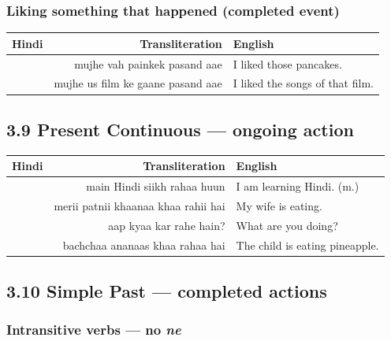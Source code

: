 \subsubsection*{Liking something that happened (completed event)}


\begin{tabular}{@{}HRG@{}}
  \toprule
  Hindi & Transliteration & English \\
  \midrule
            & mujhe vah painkek pasand aae        & I liked those pancakes. \\
     & mujhe us film ke gaane pasand aae   & I liked the songs of that film. \\
  \bottomrule
\end{tabular}

\subsection{3.9 Present Continuous — ongoing action}


\begin{tabular}{@{}HRG@{}}
  \toprule
  Hindi & Transliteration & English \\
  \midrule
             & main Hindi siikh rahaa huun          & I am learning Hindi. (m.) \\
         & merii patnii khaanaa khaa rahii hai & My wife is eating. \\
                 & aap kyaa kar rahe hain?               & What are you doing? \\
            & bachchaa ananaas khaa rahaa hai      & The child is eating pineapple. \\
  \bottomrule
\end{tabular}

\subsection{3.10 Simple Past — completed actions}

\subsubsection*{Intransitive verbs — no \textit{ne}}

